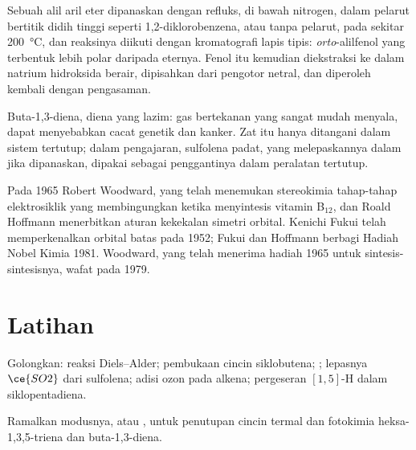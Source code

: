 \begin{inthelab}
Sebuah alil aril eter dipanaskan dengan refluks, di bawah nitrogen, dalam pelarut
bertitik didih tinggi seperti 1,2-diklorobenzena, atau tanpa pelarut, pada sekitar \qty{200}{\celsius}, dan
reaksinya diikuti dengan kromatografi lapis tipis: \textit{orto}-alilfenol yang terbentuk
lebih polar daripada eternya. Fenol itu kemudian diekstraksi ke dalam natrium
hidroksida berair, dipisahkan dari pengotor netral, dan diperoleh kembali dengan pengasaman.
\end{inthelab}

\begin{safety}{}
Buta-1,3-diena, diena yang lazim: gas bertekanan yang sangat mudah menyala, dapat menyebabkan
cacat genetik dan kanker. Zat itu hanya ditangani dalam sistem tertutup; dalam pengajaran,
sulfolena padat, yang melepaskannya dalam  jika dipanaskan, dipakai
sebagai penggantinya dalam peralatan tertutup.
\end{safety}

\begin{history}
Pada 1965 Robert Woodward, yang telah menemukan stereokimia tahap-tahap elektrosiklik yang membingungkan
ketika menyintesis vitamin B$_{12}$, dan Roald Hoffmann menerbitkan
aturan kekekalan simetri orbital. Kenichi Fukui telah memperkenalkan
orbital batas pada 1952; Fukui dan Hoffmann berbagi Hadiah Nobel Kimia
1981. Woodward, yang telah menerima hadiah 1965 untuk sintesis-sintesisnya, wafat pada
1979.
\end{history}

\section{Latihan}

\begin{exercise}[$\star$]\label{exo:b3:pericyclic:1}
Golongkan: reaksi Diels--Alder; pembukaan cincin siklobutena; ; lepasnya $\ce{SO2}$ dari sulfolena; adisi ozon pada alkena;
pergeseran $[1,5]$-H dalam siklopentadiena.
\end{exercise}

\begin{exercise}[$\star$]\label{exo:b3:pericyclic:2}
Ramalkan modusnya,  atau , untuk penutupan cincin termal dan
fotokimia heksa-1,3,5-triena dan buta-1,3-diena.
\end{exercise}

